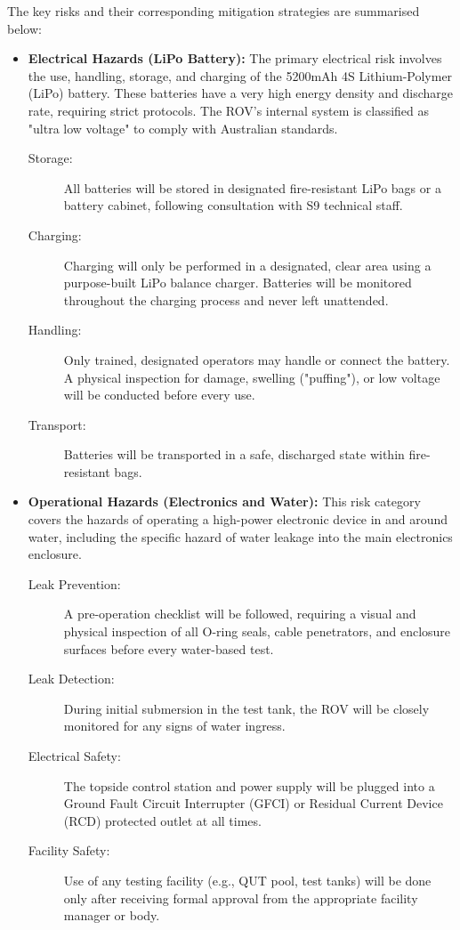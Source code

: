 \documentclass[11pt, a4paper]{article}
\begin{document}
The key risks and their corresponding mitigation strategies are summarised below:

\begin{itemize}
    \item \textbf{Electrical Hazards (LiPo Battery):}
    The primary electrical risk involves the use, handling, storage, and charging of the 5200mAh 4S Lithium-Polymer (LiPo) battery. These batteries have a very high energy density and discharge rate, requiring strict protocols. The ROV's internal system is classified as "ultra low voltage" to comply with Australian standards.
    \begin{description}
        \item[Storage:] All batteries will be stored in designated fire-resistant LiPo bags or a battery cabinet, following consultation with S9 technical staff.
        \item[Charging:] Charging will only be performed in a designated, clear area using a purpose-built LiPo balance charger. Batteries will be monitored throughout the charging process and never left unattended.
        \item[Handling:] Only trained, designated operators may handle or connect the battery. A physical inspection for damage, swelling ("puffing"), or low voltage will be conducted before every use.
        \item[Transport:] Batteries will be transported in a safe, discharged state within fire-resistant bags.
    \end{description}
    
    \item \textbf{Operational Hazards (Electronics and Water):}
    This risk category covers the hazards of operating a high-power electronic device in and around water, including the specific hazard of water leakage into the main electronics enclosure.
    \begin{description}
        \item[Leak Prevention:] A pre-operation checklist will be followed, requiring a visual and physical inspection of all O-ring seals, cable penetrators, and enclosure surfaces before every water-based test.
        \item[Leak Detection:] During initial submersion in the test tank, the ROV will be closely monitored for any signs of water ingress.
        \item[Electrical Safety:] The topside control station and power supply will be plugged into a Ground Fault Circuit Interrupter (GFCI) or Residual Current Device (RCD) protected outlet at all times.
        \item[Facility Safety:] Use of any testing facility (e.g., QUT pool, test tanks) will be done only after receiving formal approval from the appropriate facility manager or body.
    \end{description}


\end{itemize}
\end{document}
